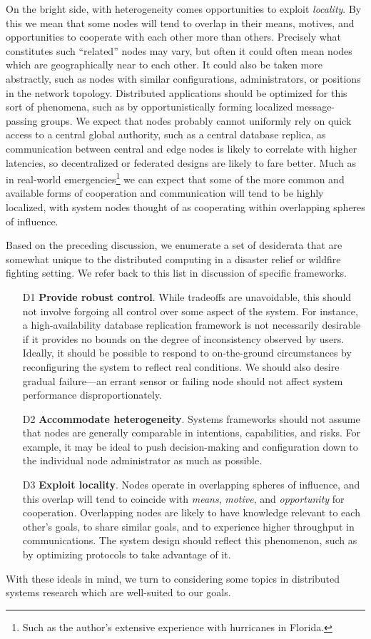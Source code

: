 On the bright side, with heterogeneity comes opportunities to exploit
\emph{locality}. By this we mean that some nodes will tend to overlap in their
means, motives, and opportunities to cooperate with each other more than others.
Precisely what constitutes such ``related'' nodes may vary, but often it could
often mean nodes which are geographically near to each other. It could also be
taken more abstractly, such as nodes with similar configurations,
administrators, or positions in the network topology. Distributed applications
should be optimized for this sort of phenomena, such as by opportunistically
forming localized message-passing groups. We expect that nodes probably cannot
uniformly rely on quick access to a central global authority, such as a central
database replica, as communication between central and edge nodes is likely to
correlate with higher latencies, so decentralized or federated designs are
likely to fare better. Much as in real-world emergencies\footnote{Such as the
author's extensive experience with hurricanes in Florida.} we can expect that
some of the more common and available forms of cooperation and communication
will tend to be highly localized, with system nodes thought of as cooperating
within overlapping spheres of influence.

Based on the preceding discussion, we enumerate a set of desiderata that are
somewhat unique to the distributed computing in a disaster relief or wildfire
fighting setting. We refer back to this list in discussion of specific
frameworks.

\begin{enumerate}
        \item[D1] \textbf{Provide robust control}. While tradeoffs are
        unavoidable, this should not involve forgoing all control over some
        aspect of the system. For instance, a high-availability database
        replication framework is not necessarily desirable if it provides no
        bounds on the degree of inconsistency observed by users. Ideally, it
        should be possible to respond to on-the-ground circumstances by
        reconfiguring the system to reflect real conditions. We should also
        desire gradual failure---an errant sensor or failing node should not
        affect system performance disproportionately.
        \item[D2] \textbf{Accommodate heterogeneity}. Systems frameworks should
        not assume that nodes are generally comparable in intentions,
        capabilities, and risks. For example, it may be ideal to push
        decision-making and configuration down to the individual node
        administrator as much as possible.
        \item[D3] \textbf{Exploit locality}. Nodes operate in overlapping
        spheres of influence, and this overlap will tend to coincide with
        \emph{means}, \emph{motive}, and \emph{opportunity} for cooperation.
        Overlapping nodes are likely to have knowledge relevant to each other's
        goals, to share similar goals, and to experience higher throughput in
        communications. The system design should reflect this phenomenon, such
        as by optimizing protocols to take advantage of it.
\end{enumerate}

With these ideals in mind, we turn to considering some topics in distributed
systems research which are well-suited to our goals.


